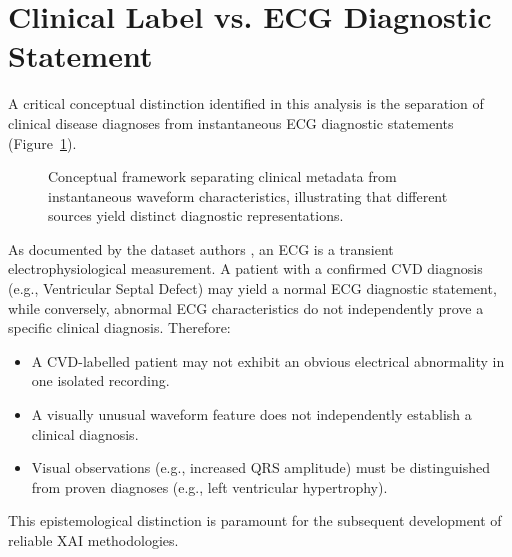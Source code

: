 \documentclass[11pt, a4paper]{article}
\begin{document}
\section{Clinical Label vs. ECG Diagnostic Statement}
A critical conceptual distinction identified in this analysis is the separation of clinical disease diagnoses from instantaneous ECG diagnostic statements (Figure~\ref{fig:clinical_vs_ecg}). 

\begin{figure}[htbp]
    \centering
    \caption{Conceptual framework separating clinical metadata from instantaneous waveform characteristics, illustrating that different sources yield distinct diagnostic representations.}
    \label{fig:clinical_vs_ecg}
\end{figure}

As documented by the dataset authors \cite{Tan2025}, an ECG is a transient electrophysiological measurement. A patient with a confirmed CVD diagnosis (e.g., Ventricular Septal Defect) may yield a normal ECG diagnostic statement, while conversely, abnormal ECG characteristics do not independently prove a specific clinical diagnosis. Therefore:
\begin{itemize}
    \item A CVD-labelled patient may not exhibit an obvious electrical abnormality in one isolated recording.
    \item A visually unusual waveform feature does not independently establish a clinical diagnosis.
    \item Visual observations (e.g., increased QRS amplitude) must be distinguished from proven diagnoses (e.g., left ventricular hypertrophy).
\end{itemize}
This epistemological distinction is paramount for the subsequent development of reliable XAI methodologies.
\end{document}

